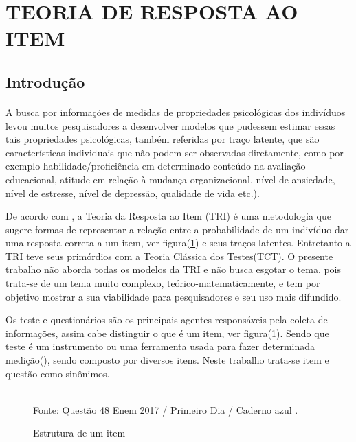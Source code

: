 \section{TEORIA DE RESPOSTA AO ITEM}
	\subsection{Introdução}
	\paragraph{}
	    A busca por informações de medidas de propriedades psicológicas dos indivíduos levou muitos pesquisadores a desenvolver modelos que pudessem estimar essas tais propriedades psicológicas, também referidas por traço latente, que são características individuais que não podem ser observadas diretamente, como por exemplo habilidade/proficiência em determinado conteúdo na avaliação educacional, atitude em relação à mudança organizacional, nível de ansiedade, nível de estresse, nível de depressão, qualidade de vida etc.). \cite{Araujo}
	\par
		De acordo com \textcite{Dalton}, a Teoria da Resposta ao Item (TRI) é uma metodologia que sugere formas de representar a relação entre a probabilidade de um indivíduo dar uma resposta correta a um item, ver figura(\ref{fig:ques}) e seus traços latentes. Entretanto a TRI teve seus primórdios com a Teoria Clássica dos Testes(TCT). O presente trabalho não aborda todas os modelos da TRI e não busca esgotar o tema, pois trata-se de um tema muito complexo, teórico-matematicamente, e tem por objetivo mostrar a sua viabilidade para pesquisadores e seu uso mais difundido.
	\par
		Os teste e questionários são os principais agentes responsáveis pela coleta de informações, assim cabe distinguir o que é um item, ver figura(\ref{fig:ques}). Sendo que teste é um instrumento ou uma ferramenta usada para fazer determinada medição(\cite{James}), sendo composto por diversos itens. Neste trabalho trata-se item e questão como sinônimos.
	\begin{figure}[!h]
		\centering
		\caption{Estrutura de um item}
		\\
		Fonte: Questão 48 Enem 2017 / Primeiro Dia / Caderno azul .
		\label{fig:ques}
	\end{figure}
